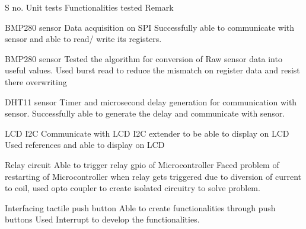S no. Unit tests Functionalities tested Remark
\begin{DoxyEnumerate}
\item BMP280 sensor Data acquisition on SPI Successfully able to communicate with sensor and able to read/ write its registers.
\item BMP280 sensor Tested the algorithm for conversion of Raw sensor data into useful values. Used burst read to reduce the mismatch on register data and resist there overwriting
\item DHT11 sensor Timer and microsecond delay generation for communication with sensor. Successfully able to generate the delay and communicate with sensor.
\item LCD I2C Communicate with LCD I2C extender to be able to display on LCD Used references and able to display on LCD
\item Relay circuit Able to trigger relay gpio of Microcontroller Faced problem of restarting of Microcontroller when relay gets triggered due to diversion of current to coil, used opto coupler to create isolated circuitry to solve problem.
\item Interfacing tactile push button Able to create functionalities through push buttons Used Interrupt to develop the functionalities.
\end{DoxyEnumerate}

